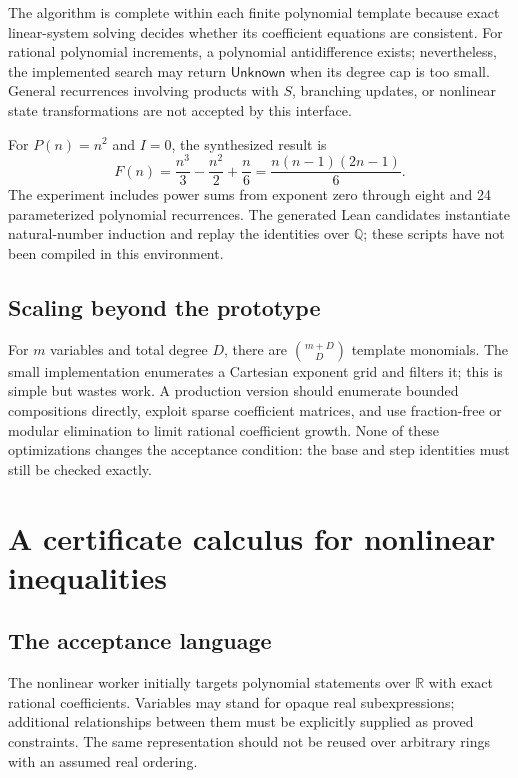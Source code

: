 \documentclass[11pt,a4paper]{article}
\theoremstyle{definition}
\newcommand{\Q}{\mathbb{Q}}
\newcommand{\R}{\mathbb{R}}
\newcommand{\unknown}{\ensuremath{\mathsf{Unknown}}}
\begin{document}
The algorithm is complete within each finite polynomial template because exact linear-system solving decides whether its coefficient equations are consistent. For rational polynomial increments, a polynomial antidifference exists; nevertheless, the implemented search may return \unknown{} when its degree cap is too small. General recurrences involving products with $S$, branching updates, or nonlinear state transformations are not accepted by this interface.

For $P(n)=n^2$ and $I=0$, the synthesized result is
\[
 F(n)=\frac{n^3}{3}-\frac{n^2}{2}+\frac n6
     =\frac{n(n-1)(2n-1)}6.
\]
The experiment includes power sums from exponent zero through eight and 24 parameterized polynomial recurrences. The generated Lean candidates instantiate natural-number induction and replay the identities over $\Q$; these scripts have not been compiled in this environment.

\subsection{Scaling beyond the prototype}

For $m$ variables and total degree $D$, there are $\binom{m+D}{D}$ template monomials. The small implementation enumerates a Cartesian exponent grid and filters it; this is simple but wastes work. A production version should enumerate bounded compositions directly, exploit sparse coefficient matrices, and use fraction-free or modular elimination to limit rational coefficient growth. None of these optimizations changes the acceptance condition: the base and step identities must still be checked exactly.

\section{A certificate calculus for nonlinear inequalities}

\subsection{The acceptance language}

The nonlinear worker initially targets polynomial statements over $\R$ with exact rational coefficients. Variables may stand for opaque real subexpressions; additional relationships between them must be explicitly supplied as proved constraints. The same representation should not be reused over arbitrary rings with an assumed real ordering.
\end{document}
